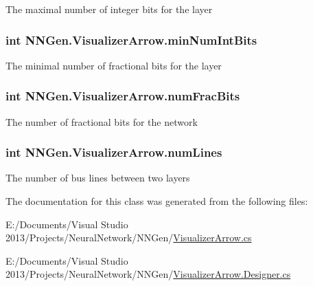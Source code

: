 The maximal number of integer bits for the layer 

\hypertarget{class_n_n_gen_1_1_visualizer_arrow_a4a80259866c98226a478e827ad55d128}{}
\subsubsection[{min\+Num\+Int\+Bits}]{\setlength{\rightskip}{0pt plus 5cm}int N\+N\+Gen.\+Visualizer\+Arrow.\+min\+Num\+Int\+Bits\hspace{0.3cm}{\ttfamily [get]}}\label{class_n_n_gen_1_1_visualizer_arrow_a4a80259866c98226a478e827ad55d128}


The minimal number of fractional bits for the layer 

\hypertarget{class_n_n_gen_1_1_visualizer_arrow_ac9df0a9dfef7922cdb08d23fbe598ede}{}
\subsubsection[{num\+Frac\+Bits}]{\setlength{\rightskip}{0pt plus 5cm}int N\+N\+Gen.\+Visualizer\+Arrow.\+num\+Frac\+Bits\hspace{0.3cm}{\ttfamily [get]}}\label{class_n_n_gen_1_1_visualizer_arrow_ac9df0a9dfef7922cdb08d23fbe598ede}


The number of fractional bits for the network 

\hypertarget{class_n_n_gen_1_1_visualizer_arrow_af443e27a47d657b4f030aa51275f8ad2}{}
\subsubsection[{num\+Lines}]{\setlength{\rightskip}{0pt plus 5cm}int N\+N\+Gen.\+Visualizer\+Arrow.\+num\+Lines\hspace{0.3cm}{\ttfamily [get]}}\label{class_n_n_gen_1_1_visualizer_arrow_af443e27a47d657b4f030aa51275f8ad2}


The number of bus lines between two layers 



The documentation for this class was generated from the following files\+:\begin{DoxyCompactItemize}
\item 
E\+:/\+Documents/\+Visual Studio 2013/\+Projects/\+Neural\+Network/\+N\+N\+Gen/\hyperlink{_visualizer_arrow_8cs}{Visualizer\+Arrow.\+cs}\item 
E\+:/\+Documents/\+Visual Studio 2013/\+Projects/\+Neural\+Network/\+N\+N\+Gen/\hyperlink{_visualizer_arrow_8_designer_8cs}{Visualizer\+Arrow.\+Designer.\+cs}\end{DoxyCompactItemize}
